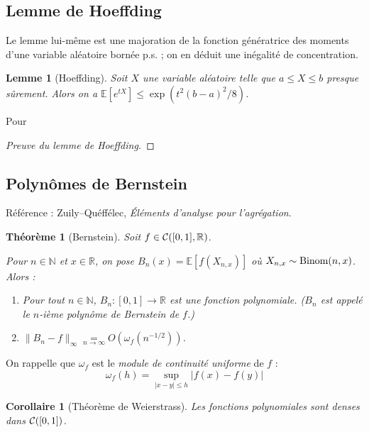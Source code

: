 \documentclass[a4paper, 11pt]{article}
\def\N{\mathbb{N}}
\def\R{\mathbb{R}}
\def\Cf{{\cal{C}}}
\def\E{\mathbb{E}}
\newtheorem*{theorem}{Théorème}
\newtheorem*{lemma}{Lemme}
\newtheorem*{corollary}{Corollaire}
\begin{document}
\newpage



\subsection{Lemme de Hoeffding}

Le lemme lui-même est une majoration de la fonction génératrice des moments
d'une variable aléatoire bornée p.s. ; on en déduit une inégalité de
concentration.

\begin{lemma}[Hoeffding]
  Soit $X$ une variable aléatoire telle que $a \leq X \leq b$ presque sûrement.
  Alors on a $\E[e^{tX}] \leq \exp(t^2(b-a)^2/8)$.
\end{lemma}

Pour 

\begin{proof}[Preuve du lemme de Hoeffding]
  
\end{proof}


\newpage

\subsection{Polynômes de Bernstein}

Référence : Zuily--Quéffélec, \emph{Éléments d'analyse pour l'agrégation}.

\begin{theorem}[Bernstein]
  Soit $f \in \Cf([0,1], \R)$.
  
  Pour $n \in \N$ et $x \in \R$, on pose $B_n(x) = \E[f(X_{n,x})]$ où $X_{n,x}
  \sim \textnormal{Binom}(n,x)$. Alors :
  \begin{enumerate}
  \item Pour tout $n \in \N$, $B_n : [0,1] \to \R$ est une fonction polynomiale.
    ($B_n$ est appelé le $n$-ième polynôme de Bernstein de $f$.)
  \item $\|B_n - f\|_\infty \underset{n \to \infty}{=} O\left(
      \omega_f(n^{-1/2}) \right)$.
  \end{enumerate}
\end{theorem}

On rappelle que $\omega_f$ est le \emph{module de continuité uniforme} de $f$ :
\[ \omega_f(h) = \sup_{|x-y| \leq h} |f(x) - f(y)| \]

\begin{corollary}[Théorème de Weierstrass]
  Les fonctions polynomiales sont denses dans $\Cf([0,1])$.
\end{corollary}
\end{document}
